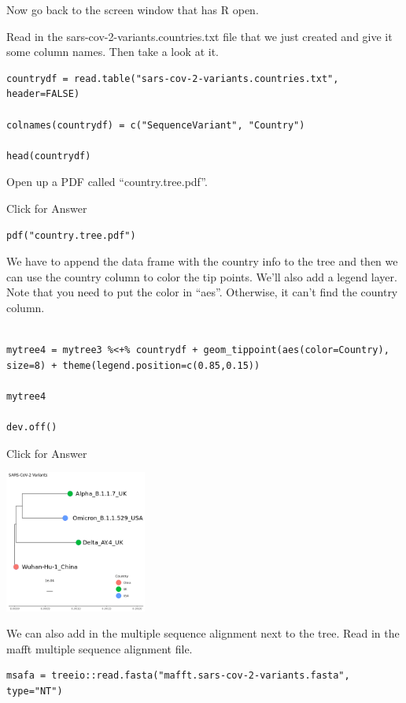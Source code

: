 \documentclass[
]{book}
\begin{document}
Now go back to the screen window that has R open.

Read in the sars-cov-2-variants.countries.txt file that we just created and give it some column names. Then take a look at it.

\begin{verbatim}
countrydf = read.table("sars-cov-2-variants.countries.txt", header=FALSE)

colnames(countrydf) = c("SequenceVariant", "Country")

head(countrydf)
\end{verbatim}

Open up a PDF called ``country.tree.pdf''.

Click for Answer

\begin{verbatim}
pdf("country.tree.pdf")
\end{verbatim}

\hfill\break

We have to append the data frame with the country info to the tree and then we can use the country column to color the tip points. We'll also add a legend layer. Note that you need to put the color in ``aes''. Otherwise, it can't find the country column.

\begin{verbatim}

mytree4 = mytree3 %<+% countrydf + geom_tippoint(aes(color=Country), size=8) + theme(legend.position=c(0.85,0.15))

mytree4

dev.off()
\end{verbatim}

Click for Answer

\includegraphics[width=0.35\textwidth,height=\textheight]{./Figures/country.tree.png}

\hfill\break

We can also add in the multiple sequence alignment next to the tree. Read in the mafft multiple sequence alignment file.

\begin{verbatim}
msafa = treeio::read.fasta("mafft.sars-cov-2-variants.fasta", type="NT")
\end{verbatim}
\end{document}
